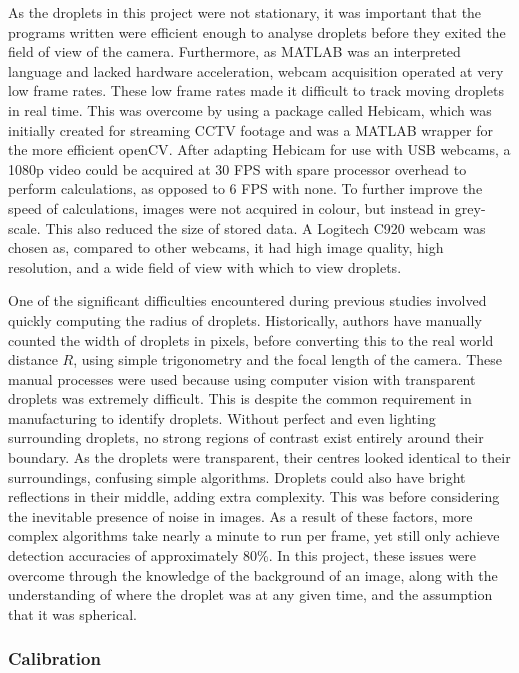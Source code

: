 \documentclass{physics_article_B}
\begin{document}
        As the droplets in this project were not stationary, it was important that the programs written were efficient enough to analyse droplets before they exited the field of view of the camera. Furthermore, as MATLAB was an interpreted language and lacked hardware acceleration, webcam acquisition operated at very low frame rates. These low frame rates made it difficult to track moving droplets in real time. This was overcome by using a package called Hebicam\cite{HebiCam}, which was initially created for streaming CCTV footage and was a MATLAB wrapper for the more efficient openCV\cite{opencv}. After adapting Hebicam for use with USB webcams, a 1080p video could be acquired at 30 FPS with spare processor overhead to perform calculations, as opposed to 6 FPS with none. To further improve the speed of calculations, images were not acquired in colour, but instead in grey-scale. This also reduced the size of stored data. A Logitech C920 webcam was chosen as, compared to other webcams, it had high image quality, high resolution, and a wide field of view with which to view droplets. 
            
        One of the significant difficulties encountered during previous studies involved quickly computing the radius of droplets. Historically, authors have manually counted the width of droplets in pixels, before converting this to the real world distance $R$, using simple trigonometry and the focal length of the camera. These manual processes were used because using computer vision with transparent droplets was extremely difficult. This is despite the common requirement in manufacturing to identify droplets\cite{bubblegeneral}. Without perfect and even lighting surrounding droplets, no strong regions of contrast exist entirely around their boundary. As the droplets were transparent, their centres looked identical to their surroundings, confusing simple algorithms\cite{bubblegeneral}. Droplets could also have bright reflections in their middle, adding extra complexity. This was before considering the inevitable presence of noise in images. As a result of these factors, more complex algorithms take nearly a minute to run per frame, yet still only achieve detection accuracies of approximately 80\%\cite{bubble2}. In this project, these issues were overcome through the knowledge of the background of an image, along with the understanding of where the droplet was at any given time, and the assumption that it was spherical. 

        \subsubsection{Calibration\label{sect:method:vision:calib}}
\end{document}
